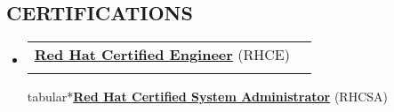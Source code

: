 \documentclass[13pt,letterpaper]{article}
\makeatletter
\newcommand{\headerrow}[2]
{\begin{tabular*}{\linewidth}{l@{\extracolsep{\fill}}r}
    #1 &
    #2 \\
\end{tabular*}}
\newcommand{\slist}[1]
{
\vspace{-1.6em}
\subsection*{\color{NavyBlue} #1}
\vspace{-0.2em}
}
\newcommand{\ssbullet}[1]
{
	\item
	\headerrow{#1}
}
\makeatother
\begin{document}
\slist{CERTIFICATIONS}

\begin{itemize}
	\parskip=0.1em
	\ssbullet{\textbf{\href{https://www.redhat.com/wapps/training/certification/verify.html?certNumber=140-025-057\&isSearch=False\&verify=Verify}{\color{NavyBlue}Red Hat Certified Engineer}} (RHCE)}

	\ssbullet{\textbf{\href{https://www.redhat.com/wapps/training/certification/verify.html?certNumber=140-025-057\&isSearch=False\&verify=Verify}{\color{NavyBlue}Red Hat Certified System Administrator}} (RHCSA)}

\end{itemize}
\end{document}
